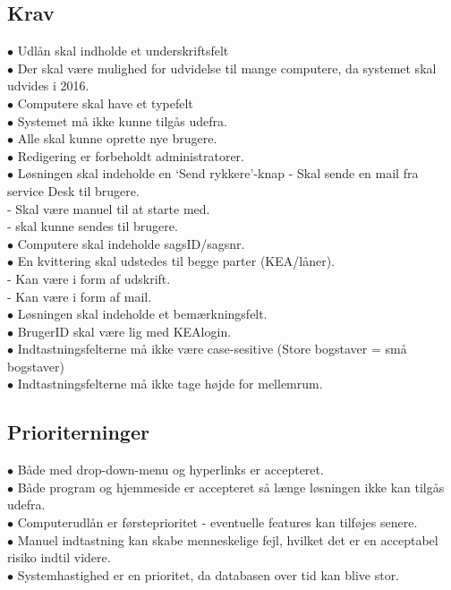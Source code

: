 \documentclass[a4paper]{article}
\begin{document}
\subsection*{Krav}
$\bullet$ Udlån skal indholde et underskriftsfelt \\
$\bullet$ Der skal være mulighed for udvidelse til mange computere, da systemet skal udvides i 2016. \\
$\bullet$ Computere skal have et typefelt\\
$\bullet$ Systemet må ikke kunne tilgås udefra. \\
$\bullet$ Alle skal kunne oprette nye brugere. \\
$\bullet$ Redigering er forbeholdt administratorer. \\
$\bullet$ Løsningen skal indeholde en ‘Send rykkere’-knap - Skal sende en mail fra service Desk til brugere. \\
\indent - Skal være manuel til at starte med. \\
\indent - skal kunne sendes til brugere. \\
$\bullet$ Computere skal indeholde sagsID/sagsnr. \\
$\bullet$ En kvittering skal udstedes til begge parter (KEA/låner).\\
\indent - Kan være i form af udskrift. \\
\indent - Kan være i form af mail. \\
$\bullet$ Løsningen skal indeholde et bemærkningsfelt. \\
$\bullet$ BrugerID skal være lig med KEAlogin. \\
$\bullet$ Indtastningsfelterne må ikke være case-sesitive (Store bogstaver = små bogstaver)\\
$\bullet$ Indtastningsfelterne må ikke tage højde for mellemrum.
\subsection*{Prioriterninger}
$\bullet$ Både med drop-down-menu og hyperlinks er accepteret. \\
$\bullet$ Både program og hjemmeside er accepteret så længe løsningen ikke kan tilgås udefra. \\
$\bullet$ Computerudlån er førsteprioritet - eventuelle features kan tilføjes senere. \\
$\bullet$ Manuel indtastning kan skabe menneskelige fejl, hvilket det er en acceptabel risiko indtil videre. \\
$\bullet$ Systemhastighed er en prioritet, da databasen over tid kan blive stor.
\end{document}
